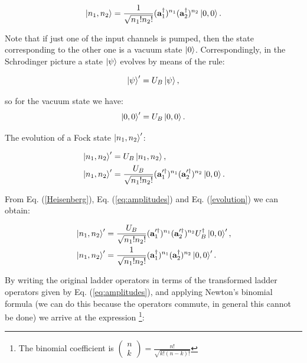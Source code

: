 \documentclass[12pt]{book}
\begin{document}
\begin{equation}
 \ket{n_{1},n_{2}}=\frac{1}{\sqrt{n_{1}! n_{2}!}} (\mathbf{a}_{1}^{\dagger})^{n_{1}}(\mathbf{a}_{2}^{\dagger})^{n_{2}} \ket{0,0}.
\end{equation}

Note that if just one of the input channels is pumped, then the state corresponding to the other one is a vacuum state $\ket{0}$. Correspondingly, in the Schrodinger picture a state $\ket{\psi}$ evolves by means of the rule:

\begin{equation}
 \ket{\psi}'=U_{B}\ket{\psi},
\end{equation}

so for the vacuum state we have:
\begin{equation}
 \ket{0,0}'=U_{B}\ket{0,0}.
 \label{evolution}
\end{equation}

The evolution of a Fock state $\ket{n_{1},n_{2}}'$:

\begin{align}
&\ket{n_{1},n_{2}}'=U_{B}\ket{n_{1},n_{2}},\\
&\ket{n_{1},n_{2}}'=\frac{U_{B}}{\sqrt{n_{1}! n_{2}!}} (\mathbf{a}_{1}'^{\dagger})^{n_{1}}(\mathbf{a}_{2}'^{\dagger})^{n_{2}} \ket{0,0}.
\end{align}

From Eq. (\ref{Heisenberg}), Eq. (\ref{eq:amplitudes}) and Eq. (\ref{evolution}) we can obtain:

\begin{align}
&\ket{n_{1},n_{2}}' =\frac{U_{B}}{\sqrt{n_{1}! n_{2}!}} (\mathbf{a}_{1}'^{\dagger})^{n_{1}}(\mathbf{a}_{2}'^{\dagger})^{n_{2}} U^{\dagger}_{B}\ket{0,0}',\\
&\ket{n_{1},n_{2}}' =\frac{1}{\sqrt{n_{1}! n_{2}!}} (\mathbf{a}_{1}^{\dagger})^{n_{1}}(\mathbf{a}_{2}^{\dagger})^{n_{2}}\ket{0,0}'.
\end{align}

By writing the original ladder operators in terms of the transformed ladder operators given by Eq. (\ref{eq:amplitudes}), and applying Newton's binomial formula (we can do this because the operators commute, in general this cannot be done) we arrive at the expression \footnote{ The binomial coefficient is $\begin{pmatrix} n \\ k \end{pmatrix} =\frac{n!}{\sqrt{k!(n-k)!}}$}:
\end{document}
